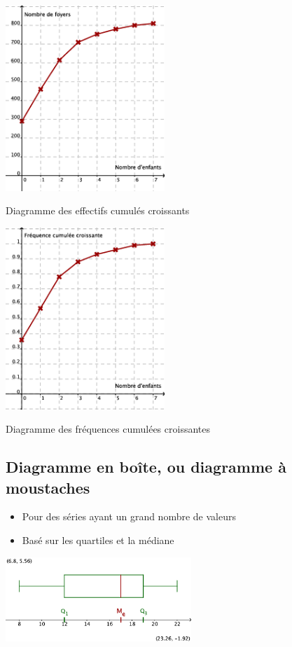 \begin{multicols}{2}
  \begin{center}
    \includegraphics[width=6cm]{Stats_Fig4_DiagEffCum}
    
    Diagramme des effectifs cumulés croissants    
  \end{center}

  \columnbreak
  \begin{center}
    \includegraphics[width=6cm]{Stats_Fig4_DiagFreqCum}

    Diagramme des fréquences cumulées croissantes
  \end{center}
\end{multicols}

\subsection{Diagramme en boîte, ou diagramme à moustaches}

\begin{itemize}
\item Pour des séries ayant un grand nombre de valeurs
\item Basé sur les quartiles et la médiane
\end{itemize}

\begin{center}
  \includegraphics[width=7cm]{Stats_Fig4_DiagBoite}  
\end{center}



